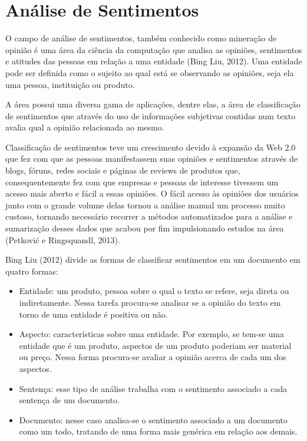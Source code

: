 \section{Análise de Sentimentos}

O campo de análise de sentimentos, também conhecido como mineração de opinião é uma área da
ciência da computação que analisa as opiniões, sentimentos e atitudes das pessoas em relação
a uma entidade (Bing Liu, 2012)\citep{bingliu2012}. Uma entidade pode ser definida como o sujeito ao qual está
se observando as opiniões, seja ela uma pessoa, instituição ou produto.

A área possui uma diversa gama de aplicações, dentre elas, a área de classificação de sentimentos
que através do uso de informações subjetivas contidas num texto avalia qual a opinião relacionada
ao mesmo.

Classificação de sentimentos teve um crescimento devido à expansão da Web 2.0 que fez com que
as pessoas manifestassem suas opiniões e sentimentos através de blogs, fóruns, redes sociais
e páginas de reviews de produtos que, consequentemente fez com que empresas e pessoas de interesse
tivessem um acesso mais aberto e fácil a essas opiniões. O fácil acesso às opiniões dos usuários
junto com o grande volume delas tornou a análise manual um processo muito custoso, tornando
necessário recorrer a métodos automatizados para a análise e sumarização desses dados que
acabou por fim impulsionando estudos na área (Petković e Ringsquandl, 2013)\citep{petkovic2013}.

Bing Liu (2012)\cite{bingliu2012} divide as formas de classificar sentimentos 
em um documento em quatro formas:
\begin{itemize}
	\item Entidade:  um produto, pessoa sobre o qual o texto se refere, seja direta ou indiretamente.
	Nessa tarefa procura-se analisar se a opinião do texto em torno de uma entidade é positiva ou
	não.
	\item Aspecto: características sobre uma entidade. Por exemplo, se tem-se uma entidade que é um
	produto, aspectos de um produto poderiam ser material ou preço. Nessa forma procura-se avaliar
	a opinião acerca de cada um dos aspectos.
	\item Sentença: esse tipo de análise trabalha com o sentimento associado a cada sentença de
	um documento.
	\item Documento: nesse caso analisa-se o sentimento associado a um documento como um todo, 
	tratando de uma forma mais genérica em relação aos demais.
\end{itemize}

